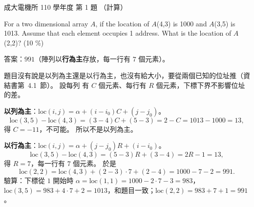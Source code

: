 \begin{pastexam}[label={px:ncku-110-ee-ds-01}]{成大電機所 110 學年度 第 1 題}
（計算）

For a two dimensional array $A$, if the location of $A$(4,3) is 1000 and $A$(3,5) is 1013. Assume
that each element occupies 1 address. What is the location of $A$(2,2)? \hfill (10 \%)
\end{pastexam}

\begin{pastsoln}
答案：$991$（陣列以\textbf{行為主}存放，每一行有 $7$ 個元素）。

題目沒有說是以列為主還是以行為主，也沒有給大小，要從兩個已知的位址推（資結書第~4.1~節）。 設每列
有 $C$ 個元素、每行有 $R$ 個元素，下標下界不影響位址的差。

\textbf{以列為主}：$\mathrm{loc}(i, j) = \alpha + (i - i_0)C + (j - j_0)$。
\[
\mathrm{loc}(3, 5) - \mathrm{loc}(4, 3) = (3 - 4)C + (5 - 3) = 2 - C = 1013 - 1000 = 13,
\]
得 $C = -11$，不可能。 所以不是以列為主。

\textbf{以行為主}：$\mathrm{loc}(i, j) = \alpha + (j - j_0)R + (i - i_0)$。
\[
\mathrm{loc}(3, 5) - \mathrm{loc}(4, 3) = (5 - 3)R + (3 - 4) = 2R - 1 = 13,
\]
得 $R = 7$，每一行有 $7$ 個元素。 於是
\[
\mathrm{loc}(2, 2) = \mathrm{loc}(4, 3) + (2 - 3) \cdot 7 + (2 - 4) = 1000 - 7 - 2 = 991.
\]
驗算：下標從 $1$ 開始時 $\alpha = \mathrm{loc}(1, 1) = 1000 - 2 \cdot 7 - 3 = 983$，
$\mathrm{loc}(3, 5) = 983 + 4 \cdot 7 + 2 = 1013$，和題目一致；$\mathrm{loc}(2, 2) = 983 + 7 + 1 = 991$。
\end{pastsoln}
